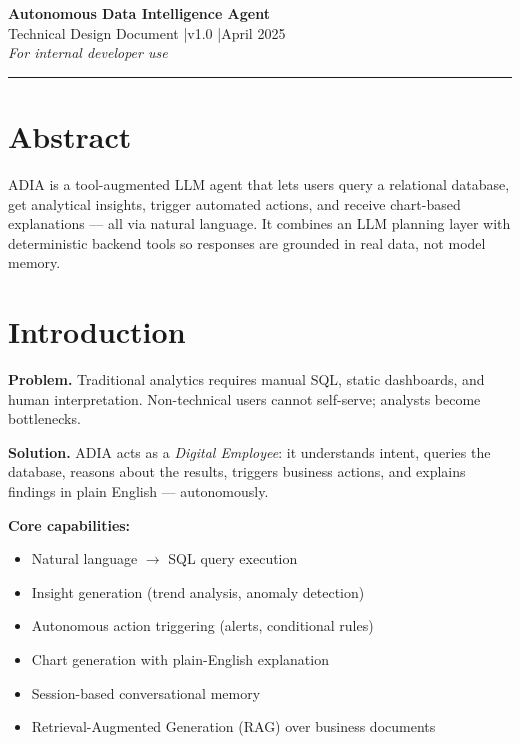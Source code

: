 \documentclass[11pt,a4paper]{article}
\begin{document}
\begin{center}
  {\LARGE\bfseries\color{primary} Autonomous Data Intelligence Agent}\\[4pt]
  {\large\color{gray} Technical Design Document \quad|\quad v1.0 \quad|\quad April 2025}\\[2pt]
  \textit{\small For internal developer use}
\end{center}
\noindent\color{primary}\rule{\linewidth}{1pt}\color{black}

\section{Abstract}

ADIA is a tool-augmented LLM agent that lets users query a relational database, get analytical insights, trigger automated actions, and receive chart-based explanations --- all via natural language. It combines an LLM planning layer with deterministic backend tools so responses are grounded in real data, not model memory.

\section{Introduction}

\textbf{Problem.} Traditional analytics requires manual SQL, static dashboards, and human interpretation. Non-technical users cannot self-serve; analysts become bottlenecks.

\textbf{Solution.} ADIA acts as a \textit{Digital Employee}: it understands intent, queries the database, reasons about the results, triggers business actions, and explains findings in plain English --- autonomously.

\textbf{Core capabilities:}
\begin{itemize}
  \item Natural language $\rightarrow$ SQL query execution
  \item Insight generation (trend analysis, anomaly detection)
  \item Autonomous action triggering (alerts, conditional rules)
  \item Chart generation with plain-English explanation
  \item Session-based conversational memory
  \item Retrieval-Augmented Generation (RAG) over business documents
\end{itemize}
\end{document}
